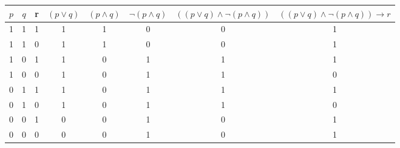 {\small
\begin{tabular}{c c c | c | c | c | c | c }
$p$ & $q$  & r & $(p\lor q)$ & $(p\land q)$ &  $\neg (p\land q)$ & $((p\lor q)\land \neg(p\land q))$ & $((p\lor q)\land \neg(p\land q))\to r$ \\\hline

1 & 1 & 1 & 1 &1&0&  0 & 1\\

1 & 1 & 0 & 1 &1&0&  0& 1\\

1 & 0 & 1 & 1 &0&1& 1& 1\\

1 & 0 & 0  & 1 &0& 1&1& 0\\

0 & 1 &  1 & 1 &0& 1 &1 & 1\\

0 & 1 & 0 & 1 &0&1& 1 & 0\\

0 & 0 & 1 & 0 &0& 1 &0& 1\\

0 & 0 & 0 & 0 &0&1 &0& 1

\end{tabular}}

